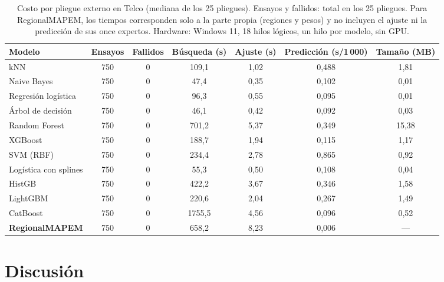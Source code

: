 \documentclass[11pt,a4paper]{article}
\begin{document}
\begin{table}[t]
\centering
\caption{Costo por pliegue externo en Telco (mediana de los 25 pliegues). Ensayos y fallidos: total en los 25 pliegues. Para RegionalMAPEM, los tiempos corresponden solo a la parte propia (regiones y pesos) y no incluyen el ajuste ni la predicción de sus once expertos. Hardware: Windows 11, 18 hilos lógicos, un hilo por modelo, sin GPU.}
\label{tab:costo}
\footnotesize
\setlength{\tabcolsep}{4pt}
\begin{tabular}{lcccccc}
\toprule
Modelo & Ensayos & Fallidos & Búsqueda (s) & Ajuste (s) & Predicción (s/1\,000) & Tamaño (MB) \\
\midrule
kNN & 750 & 0 & 109{,}1 & 1{,}02 & 0{,}488 & 1{,}81 \\
Naive Bayes & 750 & 0 & 47{,}4 & 0{,}35 & 0{,}102 & 0{,}01 \\
Regresión logística & 750 & 0 & 96{,}3 & 0{,}55 & 0{,}095 & 0{,}01 \\
Árbol de decisión & 750 & 0 & 46{,}1 & 0{,}42 & 0{,}092 & 0{,}03 \\
Random Forest & 750 & 0 & 701{,}2 & 5{,}37 & 0{,}349 & 15{,}38 \\
XGBoost & 750 & 0 & 188{,}7 & 1{,}94 & 0{,}115 & 1{,}17 \\
SVM (RBF) & 750 & 0 & 234{,}4 & 2{,}78 & 0{,}865 & 0{,}92 \\
Logística con splines & 750 & 0 & 55{,}3 & 0{,}50 & 0{,}108 & 0{,}04 \\
HistGB & 750 & 0 & 422{,}2 & 3{,}67 & 0{,}346 & 1{,}58 \\
LightGBM & 750 & 0 & 220{,}6 & 2{,}04 & 0{,}267 & 1{,}49 \\
CatBoost & 750 & 0 & 1755{,}5 & 4{,}56 & 0{,}096 & 0{,}52 \\
\textbf{RegionalMAPEM} & 750 & 0 & 658{,}2 & 8{,}23 & 0{,}006 & --- \\
\bottomrule
\end{tabular}
\end{table}

\section{Discusión}\label{sec:discussion}
\end{document}
